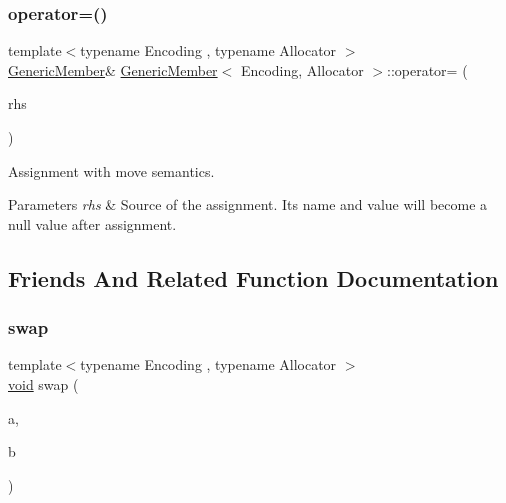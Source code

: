 \subsubsection{\texorpdfstring{operator=()}{operator=()}}
{\footnotesize\ttfamily template$<$typename Encoding , typename Allocator $>$ \\
\hyperlink{classGenericMember}{Generic\+Member}\& \hyperlink{classGenericMember}{Generic\+Member}$<$ Encoding, Allocator $>$\+::operator= (\begin{DoxyParamCaption}\item[{\hyperlink{classGenericMember}{Generic\+Member}$<$ Encoding, Allocator $>$ \&}]{rhs }\end{DoxyParamCaption})\hspace{0.3cm}{\ttfamily [inline]}}



Assignment with move semantics. 


\begin{DoxyParams}{Parameters}
{\em rhs} & Source of the assignment. Its name and value will become a null value after assignment. \\
\hline
\end{DoxyParams}


\subsection{Friends And Related Function Documentation}
\mbox{\label{classGenericMember_af72094da5f8967de3fab3d2c34bc71cc}} 
\subsubsection{\texorpdfstring{swap}{swap}}
{\footnotesize\ttfamily template$<$typename Encoding , typename Allocator $>$ \\
\hyperlink{imgui__impl__opengl3__loader_8h_ac668e7cffd9e2e9cfee428b9b2f34fa7}{void} swap (\begin{DoxyParamCaption}\item[{\hyperlink{classGenericMember}{Generic\+Member}$<$ Encoding, Allocator $>$ \&}]{a,  }\item[{\hyperlink{classGenericMember}{Generic\+Member}$<$ Encoding, Allocator $>$ \&}]{b }\end{DoxyParamCaption})\hspace{0.3cm}{\ttfamily [friend]}}




